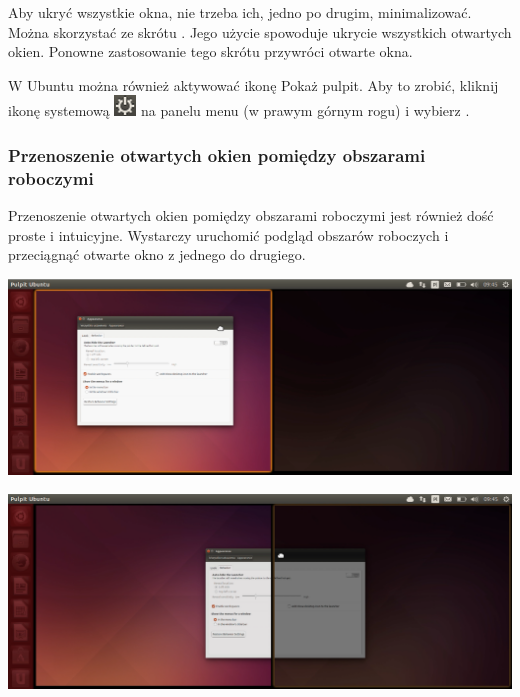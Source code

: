Aby ukryć wszystkie okna, nie trzeba ich, jedno po drugim, minimalizować. Można skorzystać ze skrótu . Jego użycie spowoduje ukrycie wszystkich otwartych okien. Ponowne zastosowanie tego skrótu przywróci otwarte okna.

W Ubuntu można również aktywować ikonę \textcolor{ubuntu_orange}{Pokaż pulpit}. Aby to zrobić, kliknij ikonę systemową \includegraphics{images/ikony_zasilanie.png} na panelu menu (w prawym górnym rogu) i wybierz .

\subsubsection{Przenoszenie otwartych okien pomiędzy obszarami roboczymi}
Przenoszenie otwartych okien pomiędzy obszarami roboczymi jest również dość proste i intuicyjne. Wystarczy uruchomić podgląd obszarów roboczych i przeciągnąć otwarte okno z jednego do drugiego.

\begin{center}
	\includegraphics[width=\linewidth]{images/unity_okno_przenoszenie1.png}
\end{center}

\begin{center}
	\includegraphics[width=\linewidth]{images/unity_okno_przenoszenie2.png}
\end{center}

